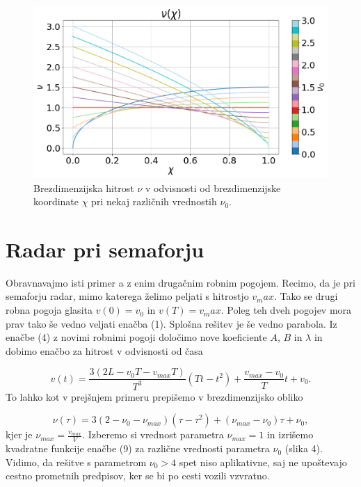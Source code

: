 \documentclass[slovene,11pt,a4paper]{article}
\begin{document}
\begin{figure}[h!]
\centering
\includegraphics[width=\linewidth]{ZacetniProblem3.png}
\caption{Brezdimenzijska hitrost $\nu$ v odvisnosti od brezdimenzijske koordinate $\chi$ pri nekaj različnih vrednostih $\nu_0$.}
\end{figure}

\section{Radar pri semaforju}

Obravnavajmo isti primer a z enim drugačnim robnim pogojem. Recimo, da je pri semaforju radar, mimo katerega želimo peljati s hitrostjo $v_max$. Tako se drugi robna pogoja glasita $v(0) = v_0$ in $v(T) = v_max$. Poleg teh dveh pogojev mora prav tako še vedno veljati enačba (1). Splošna rešitev je še vedno parabola. Iz enačbe (4) z novimi robnimi pogoji določimo nove koeficiente $A$, $B$ in $\lambda$ in dobimo enačbo za hitrost v odvisnosti od časa

\begin{equation}
v(t) = \frac{3(2L - v_0T - v_{max}T)}{T^3} (Tt-t^2) + \frac{v_{max} - v_0}{T} t + v_0.
\end{equation}
To lahko kot v prejšnjem primeru prepišemo v brezdimenzijsko obliko

\begin{equation}
\nu(\tau) = 3(2 - \nu_0 - \nu_{max})(\tau - \tau^2) + (\nu_{max} - \nu_0)\tau + \nu_0,
\end{equation}
kjer je $\nu_{max} = \frac{v_{max}}{V}$. Izberemo si vrednost parametra $\nu_{max} = 1$ in izrišemo kvadratne funkcije enačbe (9) za različne vrednosti parametra $\nu_0$ (slika 4). Vidimo, da rešitve s parametrom $\nu_0 > 4$ spet niso aplikativne, saj ne upoštevajo cestno prometnih predpisov, ker se bi po cesti vozili vzvratno.
\end{document}
